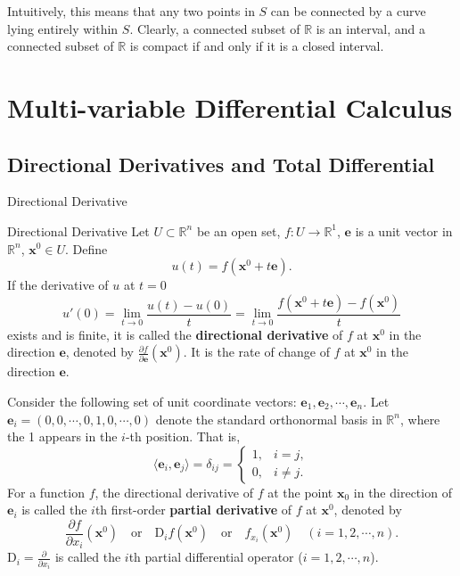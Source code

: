 \documentclass[11pt]{../../TexTemplate/elegantbook}
\begin{document}
\begin{remark}
    Intuitively, this means that any two points in \(S\) can be connected 
    by a curve lying entirely within \(S\). 
    Clearly, a connected subset of \(\mathbb{R}\) is an interval, 
    and a connected subset of \(\mathbb{R}\) is compact if and only if it is a closed interval.
\end{remark}



\chapter{Multi-variable Differential Calculus}
\section{Directional Derivatives and Total Differential}
\begin{leftbarTitle}{Directional Derivative}\end{leftbarTitle}
\begin{definition}{Directional Derivative}
    Let \(U\subset \mathbb{R}^n\) be an open set, \(f: U\to \mathbb{R}^{1}\),
    \(\mathbf{e}\) is a unit vector in \(\mathbb{R}^{n}\), \(\mathbf{x}^{0}\in U\). Define
    \[
    u(t) = f(\mathbf{x}^{0} + t\mathbf{e}).
    \]
    If the derivative of \(u\) at \(t=0\) 
    \[ 
        u'(0) = \lim_{t \to 0} \frac{u(t) - u(0)}{t} = 
        \lim_{t \to 0} \frac{f(\mathbf{x}^{0} + t\mathbf{e}) - f(\mathbf{x}^{0})}{t} 
    \] 
    exists and is finite, 
    it is called the \textbf{directional derivative} of \(f\) at \(\mathbf{x}^{0}\) in the direction \(\mathbf{e}\), 
    denoted by \(\frac{\partial f}{\partial \mathbf{e}}(\mathbf{x}^{0})\). 
    It is the rate of change of \(f\) at \(\mathbf{x}^{0}\) in the direction \(\mathbf{e}\).
\end{definition}

Consider the following set of unit coordinate vectors: \(\mathbf{e}_{1},\mathbf{e}_{2},\cdots,\mathbf{e}_{n}\).
Let \(\mathbf{e}_{i}=\left( 0, 0, \cdots, 0, 1, 0, \cdots, 0 \right)  \) denote the standard orthonormal basis 
in \(\mathbb{R}^{n}\), where the 1 appears in the \(i\)-th position. That is,
\[
    \langle \mathbf{e}_{i}, \mathbf{e}_{j} \rangle = \delta_{i j} = \begin{cases}
    1, & i = j, \\
    0, & i \neq j.
    \end{cases}
\]
For a function \( f \), the directional derivative of \( f \) at the point \( \mathbf{x}_{0} \) 
in the direction of \( \mathbf{e}_{i} \) 
is called the \( i \)th first-order \textbf{partial derivative} of \( f \) at \(\mathbf{x}^{0}\), denoted by
\[
\frac{\partial f}{\partial x_i}(\mathbf{x}^{0}) \quad \text{or} 
\quad \mathrm{D}_i f(\mathbf{x}^{0})  \quad \text{or} 
\quad f_{x_i}(\mathbf{x}^{0}) \quad (i = 1, 2, \cdots, n).
\]
\( \mathrm{D}_i = \frac{\partial}{\partial x_i} \) is called the \( i \)th partial differential operator (\( i = 1, 2, \cdots, n \)).
\end{document}
